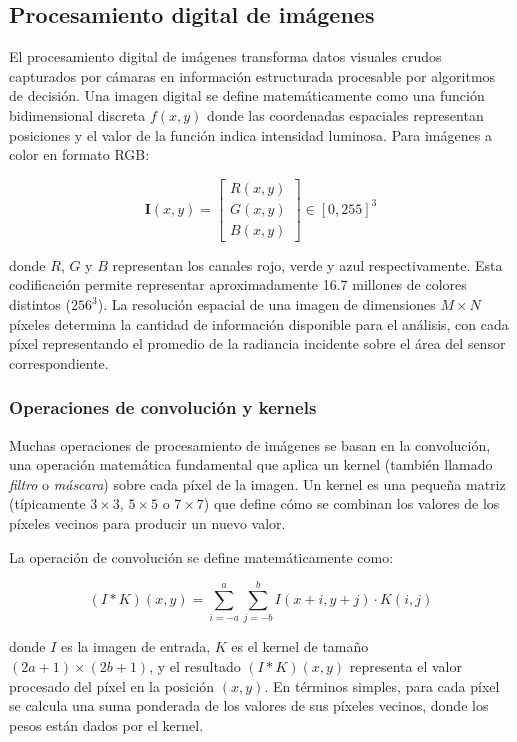 \subsection{Procesamiento digital de imágenes}

El procesamiento digital de imágenes transforma datos visuales crudos capturados por cámaras en información estructurada procesable por algoritmos de decisión. Una imagen digital se define matemáticamente como una función bidimensional discreta $f(x,y)$ donde las coordenadas espaciales representan posiciones y el valor de la función indica intensidad luminosa. Para imágenes a color en formato RGB:

\begin{equation}
\mathbf{I}(x,y) = \begin{bmatrix} R(x,y) \\ G(x,y) \\ B(x,y) \end{bmatrix} \in [0, 255]^3
\end{equation}

donde $R$, $G$ y $B$ representan los canales rojo, verde y azul respectivamente. Esta codificación permite representar aproximadamente 16.7 millones de colores distintos ($256^3$). La resolución espacial de una imagen de dimensiones $M \times N$ píxeles determina la cantidad de información disponible para el análisis, con cada píxel representando el promedio de la radiancia incidente sobre el área del sensor correspondiente.

\subsubsection{Operaciones de convolución y kernels}

Muchas operaciones de procesamiento de imágenes se basan en la convolución, una operación matemática fundamental que aplica un kernel (también llamado \textit{filtro} o \textit{máscara}) sobre cada píxel de la imagen. Un kernel es una pequeña matriz (típicamente $3 \times 3$, $5 \times 5$ o $7 \times 7$) que define cómo se combinan los valores de los píxeles vecinos para producir un nuevo valor.

La operación de convolución se define matemáticamente como:

\begin{equation}
(I \ast K)(x,y) = \sum_{i=-a}^{a} \sum_{j=-b}^{b} I(x+i, y+j) \cdot K(i,j)
\end{equation}

donde $I$ es la imagen de entrada, $K$ es el kernel de tamaño $(2a+1) \times (2b+1)$, y el resultado $(I \ast K)(x,y)$ representa el valor procesado del píxel en la posición $(x,y)$. En términos simples, para cada píxel se calcula una suma ponderada de los valores de sus píxeles vecinos, donde los pesos están dados por el kernel.

